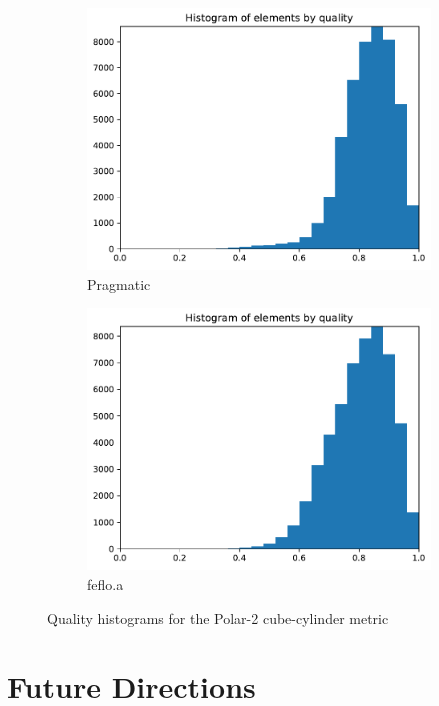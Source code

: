 \documentclass[3p,times,procedia,number]{elsarticle}
\begin{document}
\begin{figure}
\begin{subfigure}{.16\textwidth}
\includegraphics[width=\textwidth]{pragmatic-cube-cylinder-polar-2-quality.pdf}
\caption{Pragmatic}
\end{subfigure}
\begin{subfigure}{.16\textwidth}
\centering
\includegraphics[width=\textwidth]{fefloa-cube-cylinder-polar-2-quality.pdf}
\caption{feflo.a}
\end{subfigure}
\caption{Quality histograms for the Polar-2 cube-cylinder metric}
\label{fig:cube-cylinder-polar-2-qualities}
\end{figure}


\section{Future Directions}
\end{document}
